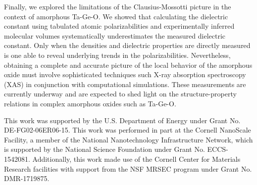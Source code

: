\documentclass[aip,jap,numerical,citeautoscript,preprint]{revtex4-1}
\begin{document}
Finally, we explored the limitations of the Clausius-Mossotti picture in the context of amorphous Ta-Ge-O. We showed that calculating the dielectric constant using tabulated atomic polarizabilities and experimentally inferred molecular volumes systematically underestimates the measured dielectric constant. Only when the densities and dielectric properties are directly measured is one able to reveal underlying trends in the polarizabilities. Nevertheless, obtaining a complete and accurate picture of the local behavior of the amorphous oxide must involve sophisticated techniques such X-ray absorption spectroscopy (XAS) in conjunction with computational simulations. These measurements are currently underway and are expected to shed light on the structure-property relations in complex amorphous oxides such as Ta-Ge-O. 

\begin{acknowledgments}
This work was supported by the U.S. Department of Energy under Grant No. DE-FG02-06ER06-15. This work was performed in part at the Cornell NanoScale Facility, a member of the National Nanotechnology Infrastructure Network, which is supported by the National Science Foundation under Grant No. ECCS-1542081. Additionally, this work made use of the Cornell Center for Materials Research facilities with support from the NSF MRSEC program under Grant No. DMR-1719875.
\end{acknowledgments}


\end{document}
